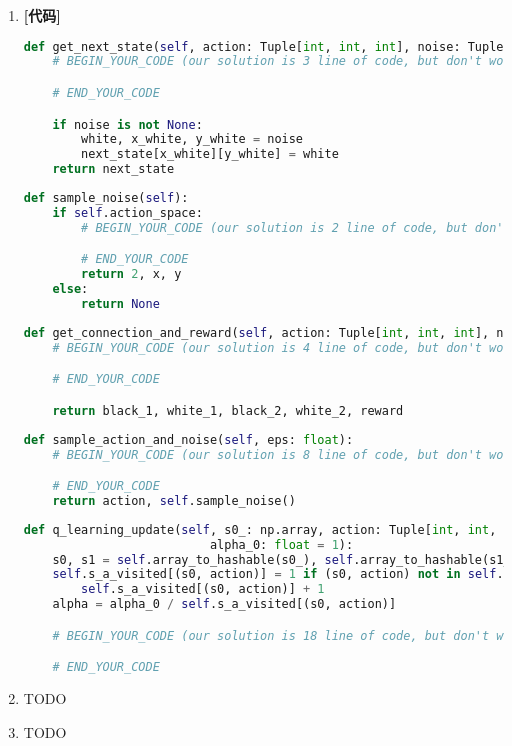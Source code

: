 \documentclass{article}
\begin{document}
\begin{enumerate}[label=(\alph*), start=1]
    \item \textbf{[代码]} %
    \begin{lstlisting}[language=Python]
def get_next_state(self, action: Tuple[int, int, int], noise: Tuple[int, int, int]):
    # BEGIN_YOUR_CODE (our solution is 3 line of code, but don't worry if you deviate from this)

    # END_YOUR_CODE

    if noise is not None:
        white, x_white, y_white = noise
        next_state[x_white][y_white] = white
    return next_state
    \end{lstlisting}
    
    \begin{lstlisting}[language=Python]
def sample_noise(self):
    if self.action_space:
        # BEGIN_YOUR_CODE (our solution is 2 line of code, but don't worry if you deviate from this)

        # END_YOUR_CODE
        return 2, x, y
    else:
        return None
    \end{lstlisting}

    \begin{lstlisting}[language=Python]
def get_connection_and_reward(self, action: Tuple[int, int, int], noise: Tuple[int, int, int]):
    # BEGIN_YOUR_CODE (our solution is 4 line of code, but don't worry if you deviate from this)

    # END_YOUR_CODE

    return black_1, white_1, black_2, white_2, reward
    \end{lstlisting}

    \begin{lstlisting}[language=Python]
def sample_action_and_noise(self, eps: float):
    # BEGIN_YOUR_CODE (our solution is 8 line of code, but don't worry if you deviate from this)

    # END_YOUR_CODE
    return action, self.sample_noise()
    \end{lstlisting}

    \begin{lstlisting}[language=Python]
def q_learning_update(self, s0_: np.array, action: Tuple[int, int, int], s1_: np.array, reward: float,
                          alpha_0: float = 1):
    s0, s1 = self.array_to_hashable(s0_), self.array_to_hashable(s1_)
    self.s_a_visited[(s0, action)] = 1 if (s0, action) not in self.s_a_visited else \
        self.s_a_visited[(s0, action)] + 1
    alpha = alpha_0 / self.s_a_visited[(s0, action)]

    # BEGIN_YOUR_CODE (our solution is 18 line of code, but don't worry if you deviate from this)

    # END_YOUR_CODE
    \end{lstlisting}

    \item TODO %

    \item TODO %
\end{enumerate}
\
\end{document}
